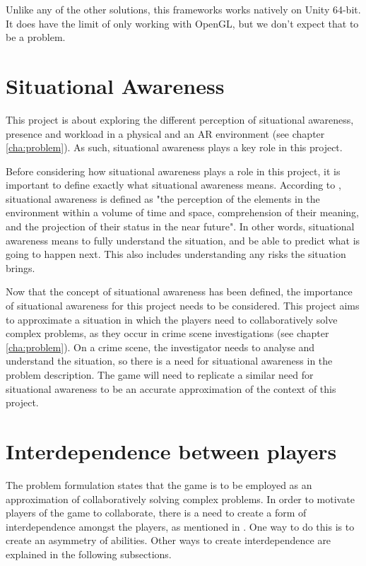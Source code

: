 				Unlike any of the other solutions, this frameworks works
				natively on Unity 64-bit. It does have the limit of only working
				with OpenGL, but we don't expect that to be a problem.


	\section{Situational Awareness} \label{sec:awareness}
		This project is about exploring the different perception of situational
		awareness, presence and workload in a physical and an AR environment
		(see chapter \ref{cha:problem}). As such, situational awareness plays a
		key role in this project.

		Before considering how situational awareness plays a role in this
		project, it is important to define exactly what situational awareness
		means. According to \cite{endsley}, situational awareness is defined as
		"the perception of the elements in the environment within a volume of
		time and space, comprehension of their meaning, and the projection of
		their status in the near future". In other words, situational awareness
		means to fully understand the situation, and be able to predict what is
		going to happen next. This also includes understanding any risks the
		situation brings.

		Now that the concept of situational awareness has been defined, the
		importance of situational awareness for this project needs to be
		considered. This project aims to approximate a situation in which the
		players need to collaboratively solve complex problems, as they occur in
		crime scene investigations (see chapter \ref{cha:problem}). On a crime
		scene, the investigator needs to analyse and understand the situation,
		so there is a need for situational awareness in the problem description.
		The game will need to replicate a similar need for situational awareness
		to be an accurate approximation of the context of this project.

	\section{Interdependence between players} \label{sec:interdependence}
		The problem formulation states that the game is to be employed as an
		approximation of collaboratively solving complex problems. In order to
		motivate players of the game to collaborate, there is a need to create
		a form of interdependence amongst the players, as mentioned in
		\cite{zagal}. One way to do this is to create an asymmetry of abilities.
		Other ways to create interdependence are explained in the following
		subsections.
